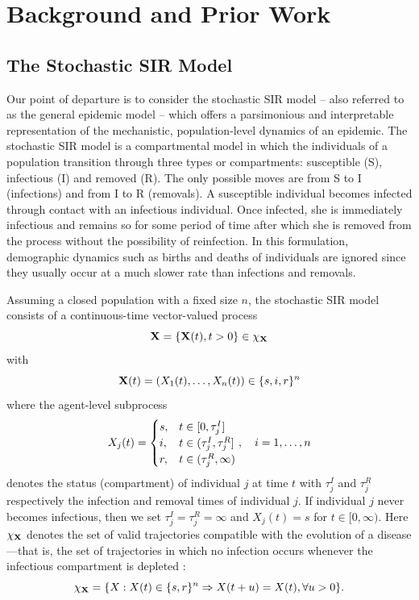 \documentclass[11pt]{article}
\begin{document}
	\section{Background and Prior Work}
	\label{sec:set}
	
	\subsection{The Stochastic SIR Model}
	\label{sec:sir}
	
	Our point of departure is to consider the stochastic SIR model -- also referred to as the general epidemic model -- which offers a parsimonious and interpretable representation of the mechanistic, population-level dynamics of an epidemic. The stochastic SIR model is a compartmental model in which the individuals of a population transition through three types or compartments: susceptible (S), infectious (I) and removed (R). The only possible moves are from S to I (infections) and from I to R (removals). A susceptible individual becomes infected through contact with an infectious individual. Once infected, she is immediately infectious and remains so for some period of time after which she is removed from the process without the possibility of reinfection. In this formulation, demographic dynamics such as births and deaths of individuals are ignored since they usually occur at a much slower rate than infections and removals.
	
	Assuming a closed population with a fixed size $n$, the stochastic SIR model consists of a continuous-time vector-valued process
	\begin{equation}
		\label{eq:X}
		\mathbf{X} = \left\lbrace \mathbf{X}(t), t>0\right\rbrace \in \chi_{\mathbf{X}}
	\end{equation}
	with
	\begin{equation}
		\mathbf{X}(t) = (X_1(t), \dots, X_n(t)) \in \{s, i, r\}^n
	\end{equation}
	where the agent-level subprocess
	$$ X_j(t) = 
	\begin{cases}
		s, & t \in [0, \tau^I_j] \\
		i, & t \in (\tau^I_j, \tau^R_j] \\
		r, & t \in (\tau^R_j, \infty)
	\end{cases}
	,\quad i=1,\dots,n
	$$
	denotes the status (compartment) of individual $j$ at time $t$ with $\tau^I_j$ and $\tau^R_j$ respectively the infection and removal times of individual $j$. If individual $j$ never becomes infectious, then we set $\tau^I_j = \tau^R_j = \infty$ and $X_j(t) = s$ for $t \in [0, \infty)$. Here $\chi_{\mathbf{X}}$ denotes the set of valid trajectories compatible with the evolution of a disease---that is, the set of trajectories in which no infection occurs whenever the infectious compartment is depleted :
	\begin{equation}
		\label{eq:chi}
		\chi_{\mathbf{X}} = \{X:X(t) \in \{s,r\}^n \Rightarrow X(t+u) = X(t), \forall u>0 \}.
	\end{equation}
	
\end{document}
